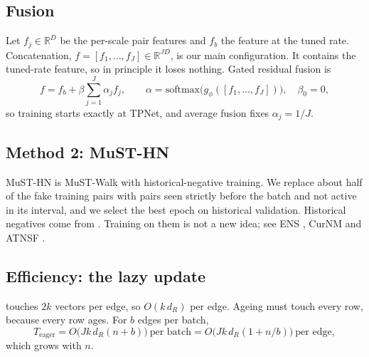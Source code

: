 \documentclass[11pt,a4paper]{article}
\theoremstyle{plain}
\theoremstyle{definition}
\newcommand{\R}{\mathbb{R}}
\begin{document}
\subsection{Fusion}
Let $f_j\in\R^D$ be the per-scale pair features and $f_b$ the feature at the tuned rate. Concatenation, $f=[f_1,\dots,f_J]\in\R^{JD}$, is our main configuration. It contains the tuned-rate feature, so in principle it loses nothing. Gated residual fusion is
\begin{equation}\label{eq:gate}
f=f_b+\beta\sum_{j=1}^{J}\alpha_jf_j,\qquad\alpha=\mathrm{softmax}\bigl(g_\phi([f_1,\dots,f_J])\bigr),\quad\beta_0=0,
\end{equation}
so training starts exactly at TPNet, and average fusion fixes $\alpha_j=1/J$.

\subsection{Method 2: MuST-HN}
MuST-HN is MuST-Walk with historical-negative training. We replace about half of the fake training pairs with pairs seen strictly before the batch and not active in its interval, and we select the best epoch on historical validation. Historical negatives come from \cite{poursafaei}. Training on them is not a new idea; see ENS \cite{ens}, CurNM \cite{curnm} and ATNSF \cite{atnsf}.

\subsection{Efficiency: the lazy update}\label{sec:maintain}
 touches $2k$ vectors per edge, so $O(k\,d_R)$ per edge. Ageing must touch every row, because every row ages. For $b$ edges per batch,
\begin{equation}\label{eq:eager}
T_{\text{eager}}=O\bigl(Jk\,d_R(n+b)\bigr)\ \text{per batch}=O\bigl(Jk\,d_R(1+n/b)\bigr)\ \text{per edge},
\end{equation}
which grows with $n$.
\end{document}
